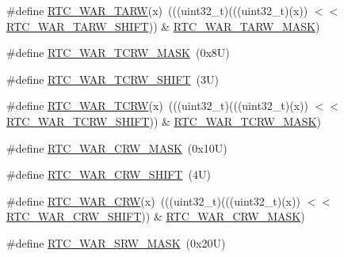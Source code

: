 \begin{DoxyCompactItemize}
\item 
\#define \mbox{\hyperlink{group___r_t_c___register___masks_gaea8be9d432dc099ab950bfd812fda728}{R\+T\+C\+\_\+\+W\+A\+R\+\_\+\+T\+A\+RW}}(x)~(((uint32\+\_\+t)(((uint32\+\_\+t)(x)) $<$$<$ \mbox{\hyperlink{group___r_t_c___register___masks_gafbed3610e58c464a444dd08dc972fdfa}{R\+T\+C\+\_\+\+W\+A\+R\+\_\+\+T\+A\+R\+W\+\_\+\+S\+H\+I\+FT}})) \& \mbox{\hyperlink{group___r_t_c___register___masks_gab38b8a6dbc68530394f37411f8ae53f9}{R\+T\+C\+\_\+\+W\+A\+R\+\_\+\+T\+A\+R\+W\+\_\+\+M\+A\+SK}})
\item 
\#define \mbox{\hyperlink{group___r_t_c___register___masks_gac045d2cc3465abd70d67c1870bcbf72c}{R\+T\+C\+\_\+\+W\+A\+R\+\_\+\+T\+C\+R\+W\+\_\+\+M\+A\+SK}}~(0x8\+U)
\item 
\#define \mbox{\hyperlink{group___r_t_c___register___masks_ga3eb83cd01492902ca7ece89636fbbdf6}{R\+T\+C\+\_\+\+W\+A\+R\+\_\+\+T\+C\+R\+W\+\_\+\+S\+H\+I\+FT}}~(3\+U)
\item 
\#define \mbox{\hyperlink{group___r_t_c___register___masks_ga6608fdb5031c434849a183da21a52054}{R\+T\+C\+\_\+\+W\+A\+R\+\_\+\+T\+C\+RW}}(x)~(((uint32\+\_\+t)(((uint32\+\_\+t)(x)) $<$$<$ \mbox{\hyperlink{group___r_t_c___register___masks_ga3eb83cd01492902ca7ece89636fbbdf6}{R\+T\+C\+\_\+\+W\+A\+R\+\_\+\+T\+C\+R\+W\+\_\+\+S\+H\+I\+FT}})) \& \mbox{\hyperlink{group___r_t_c___register___masks_gac045d2cc3465abd70d67c1870bcbf72c}{R\+T\+C\+\_\+\+W\+A\+R\+\_\+\+T\+C\+R\+W\+\_\+\+M\+A\+SK}})
\item 
\#define \mbox{\hyperlink{group___r_t_c___register___masks_ga7f2a7b622370e2141ea5dffe9e3a4d65}{R\+T\+C\+\_\+\+W\+A\+R\+\_\+\+C\+R\+W\+\_\+\+M\+A\+SK}}~(0x10\+U)
\item 
\#define \mbox{\hyperlink{group___r_t_c___register___masks_gac982942ab2487ce87ece3deb9b6b7442}{R\+T\+C\+\_\+\+W\+A\+R\+\_\+\+C\+R\+W\+\_\+\+S\+H\+I\+FT}}~(4\+U)
\item 
\#define \mbox{\hyperlink{group___r_t_c___register___masks_ga51b44191b2337f11847c7003282f4dc9}{R\+T\+C\+\_\+\+W\+A\+R\+\_\+\+C\+RW}}(x)~(((uint32\+\_\+t)(((uint32\+\_\+t)(x)) $<$$<$ \mbox{\hyperlink{group___r_t_c___register___masks_gac982942ab2487ce87ece3deb9b6b7442}{R\+T\+C\+\_\+\+W\+A\+R\+\_\+\+C\+R\+W\+\_\+\+S\+H\+I\+FT}})) \& \mbox{\hyperlink{group___r_t_c___register___masks_ga7f2a7b622370e2141ea5dffe9e3a4d65}{R\+T\+C\+\_\+\+W\+A\+R\+\_\+\+C\+R\+W\+\_\+\+M\+A\+SK}})
\item 
\#define \mbox{\hyperlink{group___r_t_c___register___masks_ga4f0eed272734e6f9a37612ea5371c4c3}{R\+T\+C\+\_\+\+W\+A\+R\+\_\+\+S\+R\+W\+\_\+\+M\+A\+SK}}~(0x20\+U)
$$
\end{DoxyCompactItemize}
